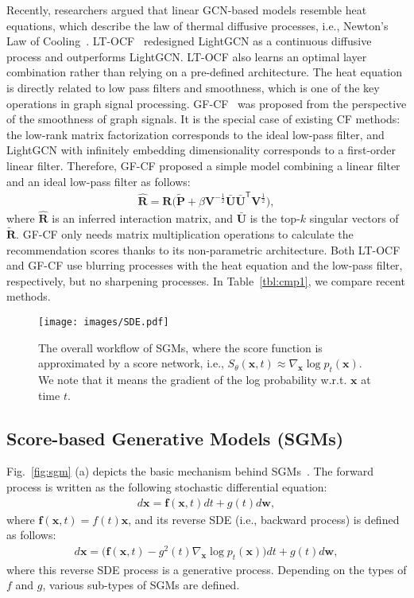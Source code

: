 \documentclass[sigconf,natbib=true]{acmart}
\begin{document}
Recently, researchers argued that linear GCN-based models resemble heat equations, which describe the law of thermal diffusive processes, i.e., Newton’s Law of Cooling~\cite{choi2021ltocf, wang2021dgc}. LT-OCF~\cite{choi2021ltocf} redesigned LightGCN as a continuous diffusive process and outperforms LightGCN. LT-OCF also learns an optimal layer combination rather than relying on a pre-defined architecture. The heat equation is directly related to low pass filters and smoothness, which is one of the key operations in graph signal processing. GF-CF~\cite{Shen21GFCF} was proposed from the perspective of the smoothness of graph signals. It is the special case of existing CF methods: the low-rank matrix factorization corresponds to the ideal low-pass filter, and LightGCN with infinitely embedding dimensionality corresponds to a first-order linear filter. Therefore, GF-CF proposed a simple model combining a linear filter and an ideal low-pass filter as follows:
\begin{align}
     \hat{\bm{R}}= \bm{R}\big(\tilde{\bm{P}} + \beta \bm{V}^{-\frac{1}{2}} \bar{\bm{U}} \bar{\bm{U}}^{\mathsf{T}}\bm{V}^{\frac{1}{2}} \big),
\end{align}where $\hat{\bm{R}}$ is an inferred interaction matrix, and $\bar{\bm{U}}$ is the top-$k$ singular vectors of $\tilde{\bm{R}}$. GF-CF only needs matrix multiplication operations to calculate the recommendation scores thanks to its non-parametric architecture. Both LT-OCF and GF-CF use blurring processes with the heat equation and the low-pass filter, respectively, but no sharpening processes. In Table~\ref{tbl:cmp1}, we compare recent methods.

\begin{figure}
    \centering
    \texttt{[image: images/SDE.pdf]}
    \caption{The overall workflow of SGMs, where the score function is approximated by a score network, i.e., $S_{\theta}(\mathbf{x},t) \approx \nabla_\mathbf{x}\log p_t(\mathbf{x})$. We note that it means the gradient of the log probability w.r.t. $\mathbf{x}$ at time $t$.}
    \label{fig:sde}
\end{figure}

\subsection{Score-based Generative Models (SGMs)}
Fig.~\ref{fig:sgm} (a) depicts the basic mechanism behind SGMs~\cite{song2021scorebased,song2021maximum,song2020improved}. The forward process is written as the following stochastic differential equation:
\begin{align}\label{eq:forward}
d\mathbf{x}=\mathbf{f}(\mathbf{x},t)dt + g(t)d\mathbf{w},
\end{align}where $\mathbf{f}(\mathbf{x},t) = f(t)\mathbf{x}$, and its reverse SDE (i.e., backward process) is defined as follows:
\begin{align}\label{eq:reverse}
d\mathbf{x}=\big(\mathbf{f}(\mathbf{x},t)-g^2(t)\nabla_\mathbf{x} \log p_t(\mathbf{x})\big)dt + g(t)d\mathbf{w},
\end{align}where this reverse SDE process is a generative process. 
Depending on the types of $f$ and $g$, various sub-types of SGMs are defined.
\end{document}
